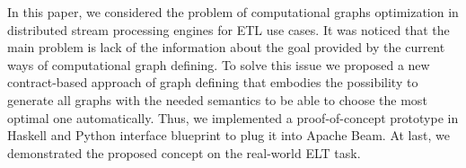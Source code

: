 In this paper, we considered the problem of computational graphs optimization in distributed stream processing engines for ETL use cases.
It was noticed that the main problem is lack of the information about the goal provided by the current ways of computational graph defining.
To solve this issue we proposed a new contract-based approach of graph defining that embodies the possibility to generate all graphs with the needed semantics to be able to choose the most optimal one automatically.
Thus, we implemented a proof-of-concept prototype in Haskell and Python interface blueprint to plug it into Apache Beam.
At last, we demonstrated the proposed concept on the real-world ELT task.
